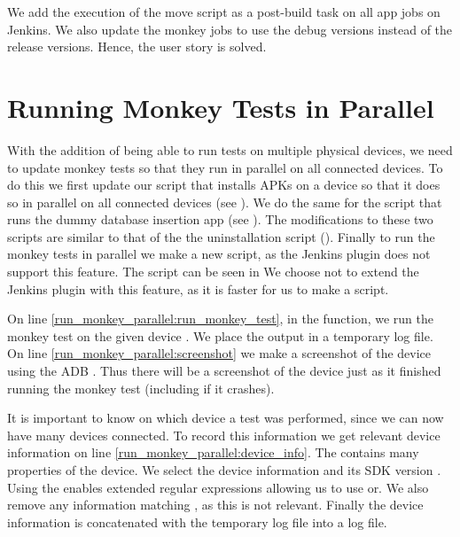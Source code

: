We add the execution of the move script as a post-build task on all app jobs on Jenkins. We also update the monkey jobs to use the debug versions instead of the release versions. Hence, the user story is solved.


\section{Running Monkey Tests in Parallel}\label{sec:monkey_in_parallel}
With the addition of being able to run tests on multiple physical devices, we need to update monkey tests so that they run in parallel on all connected devices. To do this we first update our script that installs APKs on a device so that it does so in parallel on all connected devices (see ). We do the same for the script that runs the dummy database insertion app (see ). The modifications to these two scripts are similar to that of the the uninstallation script (). Finally to run the monkey tests in parallel we make a new script, as the Jenkins plugin does not support this feature. The script can be seen in  We choose not to extend the Jenkins plugin with this feature, as it is faster for us to make a script.

On line \ref{run_monkey_parallel:run_monkey_test}, in the  function, we run the monkey test on the given device . We place the output in a temporary log file. On line \ref{run_monkey_parallel:screenshot} we make a screenshot of the device using the ADB \parencite{stackoverflow-adb-screencap2014}. Thus there will be a screenshot of the device just as it finished running the monkey test (including if it crashes). 

It is important to know on which device a test was performed, since we can now have many devices connected. To record this information we get relevant device information on line \ref{run_monkey_parallel:device_info}. The  contains many properties of the device. We select the device information and its SDK version . Using the  enables extended regular expressions allowing us to use or. We also remove any information matching , as this is not relevant. Finally the device information is concatenated with the temporary log file into a log file.

